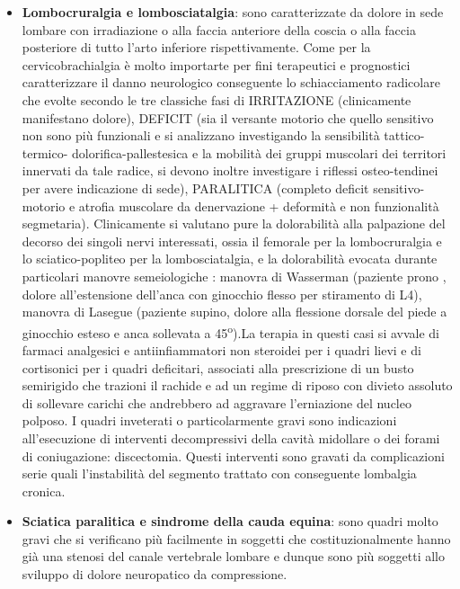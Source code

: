 \begin{itemize}
\item
  \textbf{Lombocruralgia e lombosciatalgia}: sono caratterizzate da dolore in sede lombare con irradiazione o alla faccia anteriore della coscia o alla faccia posteriore di tutto l'arto inferiore rispettivamente. Come per la cervicobrachialgia è molto importarte per fini terapeutici e prognostici caratterizzare il danno neurologico conseguente lo schiacciamento radicolare che evolte secondo le tre classiche fasi di IRRITAZIONE (clinicamente manifestano dolore), DEFICIT (sia il versante motorio che quello sensitivo non sono più funzionali e si analizzano investigando la sensibilità tattico-termico- dolorifica-pallestesica e la mobilità dei gruppi muscolari dei territori innervati da tale radice, si devono inoltre investigare i riflessi osteo-tendinei per avere indicazione di sede), PARALITICA (completo deficit sensitivo-motorio e atrofia muscolare da denervazione + deformità e non funzionalità segmetaria). Clinicamente si valutano pure la dolorabilità alla palpazione del decorso dei singoli nervi interessati, ossia il femorale per la lombocruralgia e lo sciatico-popliteo per la lombosciatalgia, e la dolorabilità evocata durante particolari manovre semeiologiche : manovra di Wasserman (paziente prono , dolore all'estensione dell'anca con ginocchio flesso per stiramento di L4), manovra di Lasegue (paziente supino, dolore alla flessione dorsale del piede a ginocchio esteso e anca sollevata a 45\textsuperscript{o}).La terapia in questi casi si avvale di farmaci analgesici e antiinfiammatori non steroidei per i quadri lievi e di cortisonici per i quadri deficitari, associati alla prescrizione di un busto semirigido che trazioni il rachide e ad un regime di riposo con divieto assoluto di sollevare carichi che andrebbero ad aggravare l'erniazione del nucleo polposo. I quadri inveterati o particolarmente gravi sono indicazioni all'esecuzione di interventi decompressivi della cavità midollare o dei forami di coniugazione: discectomia.
  Questi interventi sono gravati da complicazioni serie quali l'instabilità del segmento trattato con conseguente lombalgia cronica.
\item
  \textbf{Sciatica paralitica e sindrome della cauda equina}: sono quadri molto gravi che si verificano più facilmente in soggetti che costituzionalmente hanno già una stenosi del canale vertebrale lombare e dunque sono più soggetti allo sviluppo di dolore neuropatico da compressione.
\end{itemize}

